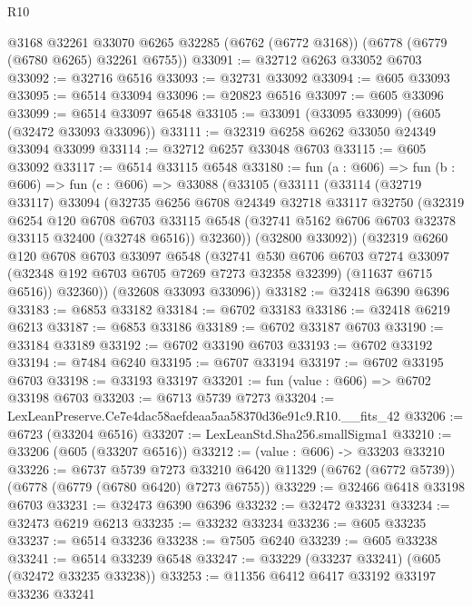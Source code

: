 \begin{lexlean}{R10}
\begin{coremodule}
    @3168
    @32261
    @33070
    @6265
    @32285
    (@6762 (@6772 @3168))
    (@6778 (@6779 (@6780 @6265) @32261 @6755))
@33091 := @32712 @6263 @33052 @6703
@33092 := @32716 @6516
@33093 := @32731 @33092
@33094 := @605 @33093
@33095 := @6514 @33094
@33096 := @20823 @6516
@33097 := @605 @33096
@33099 := @6514 @33097 @6548
@33105 := @33091 (@33095 @33099) (@605 (@32472 @33093 @33096))
@33111 := @32319 @6258 @6262 @33050 @24349 @33094 @33099
@33114 := @32712 @6257 @33048 @6703
@33115 := @605 @33092
@33117 := @6514 @33115 @6548
@33180 := fun (a : @606) =>
  fun (b : @606) =>
  fun (c : @606) =>
  @33088
    (@33105
      (@33111
        (@33114
          (@32719 @33117)
          @33094
          (@32735
            @6256
            @6708
            @24349
            @32718
            @33117
            @32750
            (@32319
              @6254
              @120
              @6708
              @6703
              @33115
              @6548
              (@32741 @5162 @6706 @6703 @32378 @33115 @32400 (@32748 @6516))
              @32360))
          (@32800 @33092))
        (@32319
          @6260
          @120
          @6708
          @6703
          @33097
          @6548
          (@32741
            @530
            @6706
            @6703
            @7274
            @33097
            (@32348 @192 @6703 @6705 @7269 @7273 @32358 @32399)
            (@11637 @6715 @6516))
          @32360))
      (@32608 @33093 @33096))
@33182 := @32418 @6390 @6396
@33183 := @6853 @33182
@33184 := @6702 @33183
@33186 := @32418 @6219 @6213
@33187 := @6853 @33186
@33189 := @6702 @33187 @6703
@33190 := @33184 @33189
@33192 := @6702 @33190 @6703
@33193 := @6702 @33192
@33194 := @7484 @6240
@33195 := @6707 @33194
@33197 := @6702 @33195 @6703
@33198 := @33193 @33197
@33201 := fun (value : @606) => @6702 @33198 @6703
@33203 := @6713 @5739 @7273
@33204 := LexLeanPreserve.Ce7e4dac58aefdeaa5aa58370d36e91c9.R10.__fits_42
@33206 := @6723 (@33204 @6516)
@33207 := LexLeanStd.Sha256.smallSigma1
@33210 := @33206 (@605 (@33207 @6516))
@33212 := (value : @606) -> @33203 @33210
@33226 := @6737
    @5739
    @7273
    @33210
    @6420
    @11329
    (@6762 (@6772 @5739))
    (@6778 (@6779 (@6780 @6420) @7273 @6755))
@33229 := @32466 @6418 @33198 @6703
@33231 := @32473 @6390 @6396
@33232 := @32472 @33231
@33234 := @32473 @6219 @6213
@33235 := @33232 @33234
@33236 := @605 @33235
@33237 := @6514 @33236
@33238 := @7505 @6240
@33239 := @605 @33238
@33241 := @6514 @33239 @6548
@33247 := @33229 (@33237 @33241) (@605 (@32472 @33235 @33238))
@33253 := @11356 @6412 @6417 @33192 @33197 @33236 @33241

\end{coremodule}
\end{lexlean}
